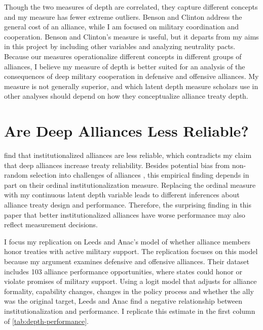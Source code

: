 \documentclass[12pt]{article}
\begin{document}
Though the two measures of depth are correlated, they capture different concepts and my measure has fewer extreme outliers. 
Benson and Clinton address the general cost of an alliance, while I am focused on military coordination and cooperation. 
Benson and Clinton's measure is useful, but it departs from my aims in this project by including other variables and analyzing neutrality pacts. 
Because our measures operationalize different concepts in different groups of alliances, I believe my measure of depth is better suited for an analysis of the consequences of deep military cooperation in defensive and offensive alliances. 
My measure is not generally superior, and which latent depth measure scholars use in other analyses should depend on how they conceptualize alliance treaty depth. 



\section{Are Deep Alliances Less Reliable?} 


\citet{LeedsAnac2005} find that institutionalized alliances are less reliable, which contradicts my claim that deep alliances increase treaty reliability. 
Besides potential bias from non-random selection into challenges of alliances \citep{Smith1995}, this empirical finding depends in part on their ordinal institutionalization measure. 
Replacing the ordinal measure with my continuous latent depth variable leads to different inferences about alliance treaty design and performance. 
Therefore, the surprising finding in this paper that better institutionalized alliances have worse performance may also reflect measurement decisions. 


I focus my replication on Leeds and Anac's model of whether alliance members honor treaties with active military support. 
The replication focuses on this model because my argument examines defensive and offensive alliances. 
Their dataset includes 103 alliance performance opportunities, where states could honor or violate promises of military support. 
Using a logit model that adjusts for alliance formality, capability changes, changes in the policy process and whether the ally was the original target, Leeds and Anac find a negative relationship between institutionalization and performance. 
I replicate this estimate in the first column of \autoref{tab:depth-performance}. 
\end{document}
